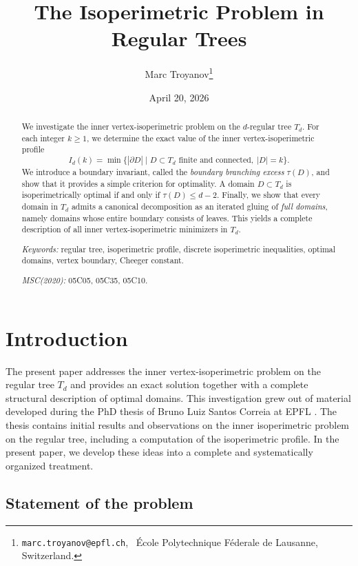 \documentclass[a4paper, 11pt]{article}
\title{The Isoperimetric Problem in Regular Trees}
\author{ Marc Troyanov\footnote{\texttt{marc.troyanov@epfl.ch},  \ {\'E}cole Polytechnique F\'ederale de Lausanne, Switzerland.}}
\date{April 20, 2026}
\numberwithin{equation}{section}
\theoremstyle{definition}
\theoremstyle{remark}
\begin{document}
\maketitle

\begin{abstract}
We investigate the inner vertex-isoperimetric problem on the $d$-regular tree $T_d$.
For each integer $k\ge 1$, we determine the exact value of the inner vertex-isoperimetric profile
\[
   I_d(k) = \min\{ |\partial D| \mid D\subset T_d \text{ finite and connected},\ |D|=k \}.
\]
We introduce a boundary invariant, called the \emph{boundary branching excess} $\tau(D)$, and show that it provides a simple criterion for optimality. A  domain $D\subset T_d$ is isoperimetrically optimal if and only if $\tau(D)\le d-2$. Finally, we show that every domain in $T_d$ admits a canonical decomposition as an iterated gluing of \emph{full domains}, namely domains whose entire boundary consists of leaves. This yields a complete description of all inner vertex-isoperimetric minimizers in  $T_d$.


\medskip

\noindent\textit{Keywords:} regular tree, isoperimetric profile, discrete isoperimetric inequalities, optimal domains, vertex boundary, Cheeger constant.

\smallskip

\noindent\textit{MSC(2020):} 05C05, 05C35, 05C10.
\end{abstract}

{
\setcounter{tocdepth}{2}
\small
\tableofcontents
}


\section{Introduction}
The present paper addresses the inner vertex-isoperimetric problem on the regular tree $T_d$ and provides an exact solution together with a complete structural description of optimal domains.
This investigation grew out of material developed during the PhD thesis of Bruno Luiz Santos Correia at EPFL \cite{CorreiaThesis2025}. The thesis contains initial results and observations on the inner isoperimetric problem on the regular tree, including a computation of the isoperimetric profile. In the present paper, we develop these ideas into a complete and systematically organized treatment.


\subsection{Statement of the problem}
\end{document}
